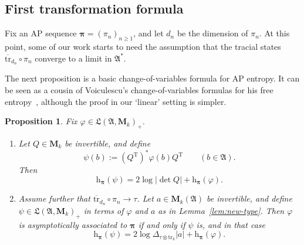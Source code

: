 \documentclass[12pt,a4paper]{article}
\numberwithin{equation}{section}
\newtheorem{prop}[thm]{Proposition}
\theoremstyle{remark}
\renewcommand{\rm}[1]{\mathrm{#1}}
\newcommand{\rmM}{\mathbf{M}}
\newcommand{\rmh}{\mathrm{h}}
\newcommand{\A}{\mathfrak{A}}
\newcommand{\frL}{\mathfrak{L}}
\renewcommand{\phi}{\varphi}
\newcommand{\bspi}{\boldsymbol{\pi}}
\newcommand{\tr}{\overline{\mathrm{tr}}}
\newcommand{\Tr}{\mathrm{tr}}
\begin{document}
\subsection{First transformation formula}

Fix an AP sequence $\bspi = (\pi_n)_{n\ge 1}$, and let $d_n$ be the dimension of $\pi_n$.  At this point, some of our work starts to need the assumption that the tracial states $\tr_{d_n}\circ \pi_n$ converge to a limit in $\A^\ast$.

The next proposition is a basic change-of-variables formula for AP entropy.  It can be seen as a cousin of Voiculescu's change-of-variables formulas for his free entropy~\cite[Prop. 3.5]{Voi94}, although the proof in our `linear' setting is simpler.

\begin{prop}\label{prop:transform}
Fix $\phi \in \frL(\A,\rmM_k)_+$.
\begin{enumerate}
\item[a.] Let $Q \in \rmM_k$ be invertible, and define
\[\psi(b) := (Q^\rm{T})^\ast \phi(b) Q^\rm{T} \qquad (b \in \A).\]
Then
\[\rmh_{\bspi}(\psi) = 2\log |\det Q| + \rmh_{\bspi}(\phi).\]

\item[b.] Assume further that $\tr_{d_n}\circ \pi_n \to \tau$.  Let $a \in \rmM_k(\A)$ be invertible, and define $\psi \in \frL(\A,\rmM_k)_+$ in terms of $\phi$ and $a$ as in Lemma~\ref{lem:new-type}. Then $\phi$ is asymptotically associated to $\bspi$ if and only if $\psi$ is, and in that case
	\[\rmh_{\bspi}(\psi) = 2\log \Delta_{\tau\otimes \Tr_k}|a| + \rmh_{\bspi}(\phi).\]
\end{enumerate}
\end{prop}
\end{document}
